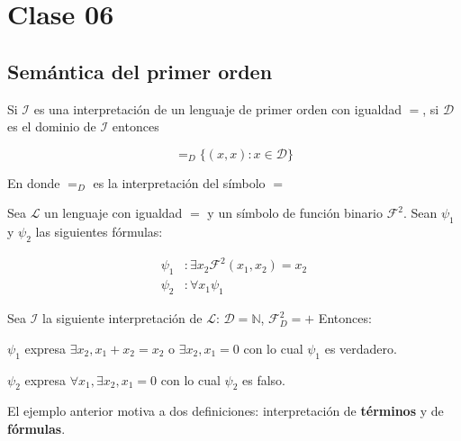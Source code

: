 \section{Clase 06}

\subsection{Sem\'antica del primer orden}

\begin{convencion}

Si $\mathcal{I}$ es una interpretaci\'on de un lenguaje de primer orden con igualdad $=$, si $\mathcal{D}$ es el dominio de $\mathcal{I}$ entonces

\[
	=_D \{ (x, x): x \in \mathcal{D}\}
\]

En donde $=_D$ es la interpretaci\'on del s\'imbolo $=$

\end{convencion}



\begin{example}

Sea $\mathcal{L}$ un lenguaje con igualdad $=$ y un s\'imbolo de funci\'on binario $\mathcal{F}^2$. Sean $\psi_1$ y $\psi_2$ las siguientes f\'ormulas:

\begin{align*}
	\psi_1 &: \exists x_2 \mathcal{F}^2(x_1, x_2) = x_2	\\
	\psi_2 &: \forall x_1 \psi_1
\end{align*}

Sea $\mathcal{I}$ la siguiente interpretaci\'on de $\mathcal{L}$: $\mathcal{D} = \mathbb{N}$, $\mathcal{F}^{2}_{D} = +$  Entonces:

\begin{center}
$\psi_1$ expresa $\exists x_2, x_1 + x_2 = x_2$ o $\exists x_2, x_1 = 0$ con lo cual $\psi_1$ es verdadero.

$\psi_2$ expresa $\forall x_1, \exists x_2, x_1 = 0$ con lo cual $\psi_2$ es falso.
\end{center}

\end{example}


El ejemplo anterior motiva a dos definiciones: interpretaci\'on de \textbf{t\'erminos} y de \textbf{f\'ormulas}.

